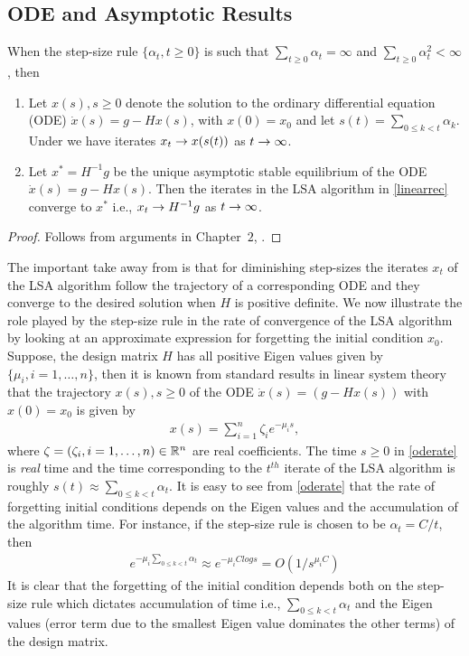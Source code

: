 \subsection{ODE and Asymptotic Results}\label{asymp}
\begin{theorem}[Asymptotics]\label{linstab} When the step-size rule $\{\alpha_t,t\geq 0\}$ is such that $\sum_{t\geq 0} \alpha_t =\infty$ and $\sum_{t\geq 0} \alpha^2_t <\infty$, then
\begin{enumerate}[leftmargin=*] 
\item Let $x(s),s\geq 0$ denote the solution to the ordinary differential equation (ODE) $\dot{x}(s)=g-Hx(s)$, with $x(0)=x_0$ and let $s(t)=\sum_{0\leq k< t}\alpha_k$. Under  we have iterates $x_t\rightarrow x(s(t))$ as $t\rightarrow\infty$.
\item Let $x^*=H^{-1}g$ be the unique asymptotic stable equilibrium of the ODE $\dot{x}(s)=g-Hx(s)$. Then the iterates in the LSA algorithm in \eqref{linearrec} converge to $x^*$ i.e., $x_t\rightarrow H^{-1}g$ as $t\rightarrow\infty$.
\end{enumerate}
\end{theorem}
\begin{proof}
Follows from arguments in Chapter~$2$, \cite{borkarsa}.
\end{proof}
The important take away from  is that for diminishing step-sizes the iterates $x_t$ of the LSA algorithm follow the trajectory of a corresponding ODE and they converge to the desired solution when $H$ is positive definite. We now illustrate the role played by the step-size rule in the rate of convergence of the LSA algorithm by looking at an approximate expression for forgetting the initial condition $x_0$. Suppose, the design matrix $H$ has all positive Eigen values given by $\{\mu_i,i=1,\ldots,n\}$, then it is known from standard results in linear system theory \cite{chen} that the trajectory $x(s),s\geq 0$ of the ODE $\dot{x}(s)=(g-Hx(s))$ with $x(0)=x_0$ is given by
\begin{align}\label{oderate}
x(s)=\sum_{i=1}^n \zeta_i e^{-\mu_i s}, 
\end{align}
where $\zeta=(\zeta_i,i=1,\ldots,n)\in \mathbb{R}^n$ are real coefficients. The time $s\geq 0$ in \eqref{oderate} is \emph{real} time and the time corresponding to the $t^{th}$ iterate of the LSA algorithm is roughly $s(t)\approx\sum_{0\leq k<t}\alpha_t$. It is easy to see from \eqref{oderate} that the rate of forgetting initial conditions depends on the Eigen values and the accumulation of the algorithm time. For instance, if the step-size rule is chosen to be $\alpha_t=C/t$, then \begin{align}\label{biasforget}e^{-\mu_i\sum_{0\leq k<t}\alpha_t}\approx e^{-\mu_i Clog s}=O(1/s^{\mu_i C})\end{align}
It is clear that the forgetting of the initial condition depends both on the step-size rule which dictates accumulation of time i.e., $\sum_{0\leq k<t}\alpha_t$ and the Eigen values (error term due to the smallest Eigen value dominates the other terms) of the design matrix. 
